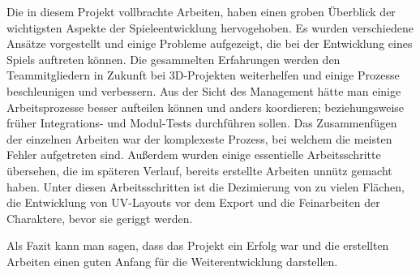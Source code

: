 Die in diesem Projekt vollbrachte Arbeiten, haben einen groben Überblick der wichtigsten Aspekte der Spieleentwicklung hervogehoben.
Es wurden verschiedene Ansätze vorgestellt und einige Probleme aufgezeigt, die bei der Entwicklung eines Spiels auftreten können.
Die gesammelten Erfahrungen werden den Teammitgliedern in Zukunft bei 3D-Projekten weiterhelfen und einige Prozesse beschleunigen und verbessern.
Aus der Sicht des Management hätte man einige Arbeitsprozesse besser aufteilen können und anders koordieren; beziehungsweise früher Integrations- und
Modul-Tests durchführen sollen. Das Zusammenfügen der einzelnen Arbeiten war der komplexeste Prozess, bei welchem die meisten Fehler aufgetreten sind.
Außerdem wurden einige essentielle Arbeitsschritte übersehen, die im späteren Verlauf, bereits erstellte Arbeiten unnütz gemacht haben.
Unter diesen Arbeitsschritten ist die Dezimierung von zu vielen Flächen, die Entwicklung von UV-Layouts vor dem Export und die Feinarbeiten der Charaktere, bevor sie geriggt werden.

Als Fazit kann man sagen, dass das Projekt ein Erfolg war und die erstellten Arbeiten einen guten Anfang für die Weiterentwicklung darstellen.
